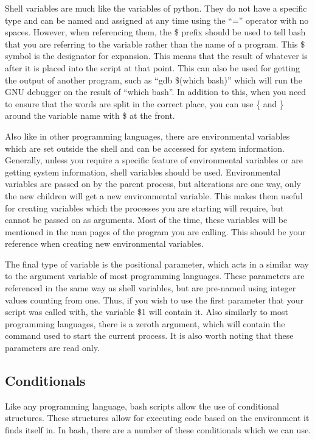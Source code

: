 \documentclass[a4paper,11pt]{report}
\begin{document}
			Shell variables are much like the variables of python. 
			They do not have a specific type and can be named and assigned at any time using the ``='' operator with no spaces.
			However, when referencing them, the \$ prefix should be used to tell bash that you are referring to the variable rather than the name of a program.
			This \$ symbol is the designator for expansion. 
			This means that the result of whatever is after it is placed into the script at that point. 
			This can also be used for getting the output of another program, such as ``gdb \$(which bash)'' which will run the GNU debugger on the result of ``which bash''. 
			In addition to this, when you need to ensure that the words are split in the correct place, you can use \{ and \} around the variable name with \$ at the front. 

			Also like in other programming languages, there are environmental variables which are set outside the shell and can be accessed for system information. 
			Generally, unless you require a specific feature of environmental variables or are getting system information, shell variables should be used. 
			Environmental variables are passed on by the parent process, but alterations are one way, only the new children will get a new environmental variable. 
			This makes them useful for creating variables which the processes you are starting will require, but cannot be passed on as arguments. 
			Most of the time, these variables will be mentioned in the man pages of the program you are calling. 
			This should be your reference when creating new environmental variables. 

			The final type of variable is the positional parameter, which acts in a similar way to the argument variable of most programming languages. 
			These parameters are referenced in the same way as shell variables, but are pre-named using integer values counting from one. 
			Thus, if you wish to use the first parameter that your script was called with, the variable \$1 will contain it. 
			Also similarly to most programming languages, there is a zeroth argument, which will contain the command used to start the current process. 
			It is also worth noting that these parameters are read only. 


		\subsection{Conditionals}
			Like any programming language, bash scripts allow the use of conditional structures. 
			These structures allow for executing code based on the environment it finds itself in. 
			In bash, there are a number of these conditionals which we can use. 
\end{document}
